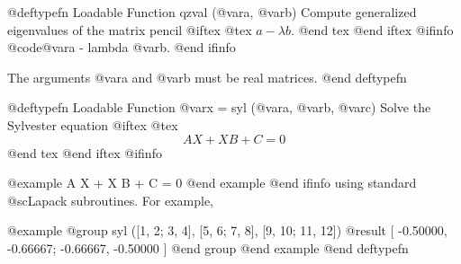 @deftypefn {Loadable Function} {} qzval (@var{a}, @var{b})
Compute generalized eigenvalues of the matrix pencil 
@iftex
@tex
$a - \lambda b$.
@end tex
@end iftex
@ifinfo
@code{@var{a} - lambda @var{b}}.
@end ifinfo

The arguments @var{a} and @var{b} must be real matrices.
@end deftypefn

@deftypefn {Loadable Function} {@var{x} =} syl (@var{a}, @var{b}, @var{c})
Solve the Sylvester equation
@iftex
@tex
$$
 A X + X B + C = 0
$$
@end tex
@end iftex
@ifinfo

@example
A X + X B + C = 0
@end example
@end ifinfo
using standard @sc{Lapack} subroutines.  For example,

@example
@group
syl ([1, 2; 3, 4], [5, 6; 7, 8], [9, 10; 11, 12])
     @result{} [ -0.50000, -0.66667; -0.66667, -0.50000 ]
@end group
@end example
@end deftypefn
